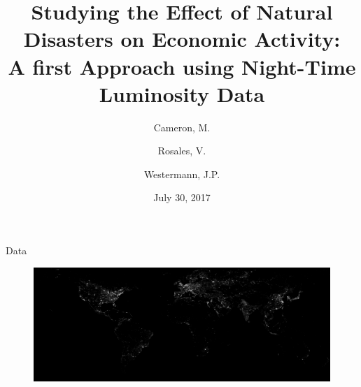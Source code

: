 \documentclass{beamer}
\title{
  Studying the Effect of Natural Disasters on Economic Activity:\\
  \large{A first Approach using Night-Time Luminosity Data}
}
\author{Cameron, M. \and Rosales, V. \and Westermann, J.P.}
\date{July 30, 2017}
\begin{document}
\begin{frame}
  \maketitle
\end{frame}

\begin{section}{Data}
  \begin{frame}
    \begin{figure}
      \centering
      \includegraphics[width=1\linewidth]{lum_2013}\label{lum_2013}
    \end{figure}			
  \end{frame}
\end{section}
\end{document}
